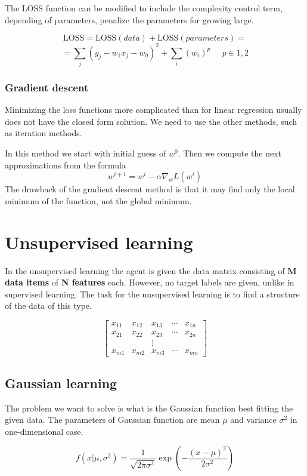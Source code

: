 \documentclass[a4paper,10pt]{article}
\begin{document}
The LOSS function can be modified to include the complexity control term, depending of parameters, penalize the parameters for growing large.

\[\mathrm{LOSS} = \mathrm{LOSS}(data) + \mathrm{LOSS}(parameters) = \]
\[ = \sum_{j} \left( y_j - w_1 x_j - w_0\right)^2 + \sum_i (w_i)^p \; \; \; \; \; p \in {1,2} \]

\subsubsection{Gradient descent}

Minimizing the loss functions more complicated than for linear regression usually does not have the closed form solution. We need to use the other methods, such as iteration methods.

In this method we start with initial guess of $w^0$. Then we compute the next approximations from the formula
\[w^{i+1} = w^i - \alpha \nabla_{w} L(w^i) \] 
The drawback of the gradient descent method is that it may find only the local minimum of the function, not the global minimum.

\section{Unsupervised learning}

In the unsupervised learning the agent is given the data matrix consisting of \textbf{M data items} of \textbf{N features} each. However, no target labels are given, unlike in supervised learning. The task for the unsupervised learning is to find a structure of the data of this type.

\[
\left[ \begin{array}{ccccc}
x_{11} & x_{12} & x_{13} & \cdots & x_{1n}  \\
x_{21} & x_{22} & x_{23} & \cdots & x_{2n}  \\
	&      & \vdots &      &      \\
x_{m1} & x_{m2} & x_{m3} & \cdots & x_{mn} \end{array} \right]
\]
\subsection{Gaussian learning}
The problem we want to solve is what is the Gaussian function best fitting the given data. The parameters of Gaussian function are mean $\mu$ and variance $\sigma^2$ in one-dimensional case.

\[ f(x|\mu, \sigma^2) = \frac{1}{\sqrt{2 \pi \sigma^2 }} \exp \left(-\frac{(x-\mu)^2}{2 \sigma^2} \right) \]
\end{document}
